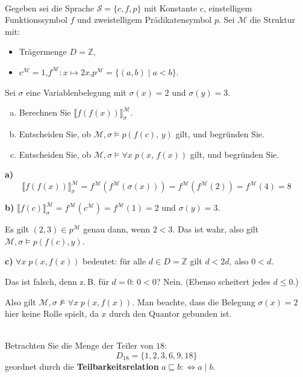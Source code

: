 \\
Gegeben sei die Sprache $\mathcal{S} = \{c, f, p\}$ mit Konstante $c$, einstelligem Funktionssymbol $f$ und zweistelligem Prädikatensymbol $p$. Sei $\mathcal{M}$ die Struktur mit:
\begin{itemize}
  \item Trägermenge $D = \mathbb{Z}$,
  \item $c^\mathcal{M} = 1$,\quad $f^\mathcal{M}: x \mapsto 2x$,\quad $p^\mathcal{M} = \{(a,b) \mid a < b\}$.
\end{itemize}
Sei $\sigma$ eine Variablenbelegung mit $\sigma(x) = 2$ und $\sigma(y) = 3$.
\begin{enumerate}[a)]
  \item Berechnen Sie $\llbracket f(f(x)) \rrbracket^\mathcal{M}_\sigma$.
  \item Entscheiden Sie, ob $\mathcal{M}, \sigma \models p(f(c),\, y)$ gilt, und begründen Sie.
  \item Entscheiden Sie, ob $\mathcal{M}, \sigma \models \forall x\; p(x,\, f(x))$ gilt, und begründen Sie.
\end{enumerate}

\begin{loesung}
\textbf{a)}
\[
  \llbracket f(f(x))\rrbracket^\mathcal{M}_\sigma = f^\mathcal{M}(f^\mathcal{M}(\sigma(x))) = f^\mathcal{M}(f^\mathcal{M}(2)) = f^\mathcal{M}(4) = 8
\]

\textbf{b)} $\llbracket f(c)\rrbracket^\mathcal{M}_\sigma = f^\mathcal{M}(c^\mathcal{M}) = f^\mathcal{M}(1) = 2$ und $\sigma(y)=3$.

Es gilt $(2,3)\in p^\mathcal{M}$ genau dann, wenn $2 < 3$. Das ist wahr, also gilt $\mathcal{M},\sigma\models p(f(c),y)$.

\textbf{c)} $\forall x\;p(x,f(x))$ bedeutet: für alle $d\in D=\mathbb{Z}$ gilt $d < 2d$, also $0 < d$.

Das ist falsch, denn z.\,B. für $d=0$: $0 < 0$? Nein. (Ebenso scheitert jedes $d\leq 0$.)

Also gilt $\mathcal{M},\sigma\not\models\forall x\;p(x,f(x))$. Man beachte, dass die Belegung $\sigma(x)=2$ hier keine Rolle spielt, da $x$ durch den Quantor gebunden ist.
\end{loesung}

\\
Betrachten Sie die Menge der Teiler von $18$:
\[
  D_{18} = \{1, 2, 3, 6, 9, 18\}
\]
geordnet durch die \textbf{Teilbarkeitsrelation} $a \sqsubseteq b :\Leftrightarrow a \mid b$.

